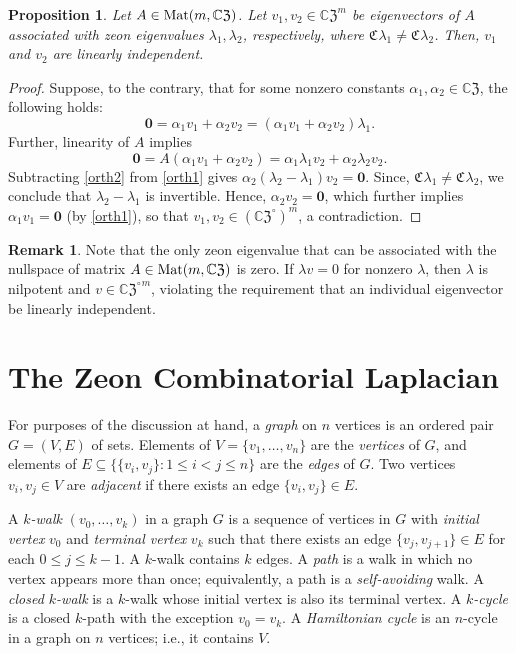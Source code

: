 \documentclass{article}
\newtheorem{proposition}[theorem]{Proposition}
\theoremstyle{definition}
\newtheorem{remark}[theorem]{Remark}
\newcommand{\zco}{\mathfrak{C}\mspace{1mu}}
\newcommand{\CZ}{\mathbb{C}\mathfrak{Z}}
\newcommand{\Mat}{{\rm Mat}}
\newcommand{\zm}{\mathbf{0}}
\numberwithin{equation}{section}
\begin{document}
\begin{proposition}
Let $A\in \Mat(m,\CZ)$.  Let $v_1,v_2\in{\CZ}^m$ be eigenvectors of $A$ associated with zeon eigenvalues $\lambda_1, \lambda_2$, respectively, where $\zco \lambda_1\ne \zco \lambda_2$.  Then, $v_1$ and $v_2$ are linearly independent.
\end{proposition}

\begin{proof}
Suppose, to the contrary, that for some nonzero constants $\alpha_1, \alpha_2\in\CZ$, the following holds:\begin{equation}\label{orth1}
\zm=\alpha_1v_1+\alpha_2v_2=(\alpha_1v_1+\alpha_2v_2)\lambda_1.
\end{equation}
Further, linearity of $A$ implies
\begin{equation}\label{orth2}
\zm=A(\alpha_1v_1+\alpha_2v_2)=\alpha_1\lambda_1v_2+\alpha_2\lambda_2v_2.
\end{equation}
Subtracting \eqref{orth2} from \eqref{orth1} gives $\alpha_2(\lambda_2-\lambda_1)v_2=\zm$.
Since, $\zco\lambda_1\ne\zco\lambda_2$, we conclude that $\lambda_2-\lambda_1$ is invertible.  Hence, $\alpha_2 v_2=\zm$, which further implies $\alpha_1v_1=\zm$ (by \eqref{orth1}), so that $v_1,v_2\in({\CZ}^\circ)^m$, a contradiction.   
\end{proof}

\begin{remark}
Note that the only zeon eigenvalue that can be associated with the nullspace of matrix $A\in\Mat(m,\CZ)$ is zero.  If $\lambda v=0$ for nonzero $\lambda$, then $\lambda$ is nilpotent and $v\in{{\CZ}^\circ}^m$, violating the requirement that an individual eigenvector be linearly independent.  
\end{remark}



\section{The Zeon Combinatorial Laplacian}\label{zeon Laplacian}

For purposes of the discussion at hand, a {\em graph} on $n$ vertices is an ordered pair $G=(V,E)$ of sets.  Elements of $V=\{v_1, \ldots, v_n\}$ are the {\em vertices} of $G$, and elements of $E\subseteq\{\{v_i, v_j\}: 1\le i<j\le n\}$ are the {\em edges} of $G$.  Two vertices $v_i,v_j\in V$ are {\em adjacent} if there exists an edge $\{v_i,v_j\}\in E$.  

A {\em $k$-walk} $(v_0,\ldots,v_k)$ in a graph $G$ is a sequence of vertices in $G$ with {\em initial vertex} $v_0$ and {\em terminal vertex} $v_k$ such that there exists an edge
$\{v_j,v_{j+1}\}\in E$ for each $0\le j\le k-1$.  A $k$-walk contains $k$ edges.  A {\em path} is a walk in which no vertex appears more than once; equivalently, a path is a {\em self-avoiding} walk.  A {\em closed $k$-walk} is a $k$-walk whose initial vertex is also its terminal vertex.  A {\em $k$-cycle} is a closed $k$-path with the exception $v_0=v_k$.  A {\em Hamiltonian cycle} is an $n$-cycle in a graph on $n$ vertices; i.e., it contains $V$. 
\end{document}
